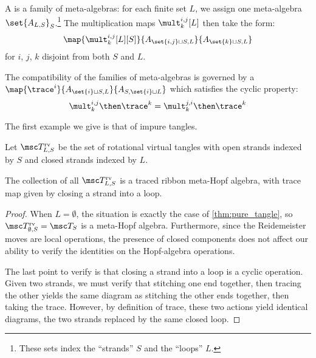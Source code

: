 \documentclass{article}
\begin{document}
\begin{definition}
        A  is a family of meta-algebras: for each
        finite set $L$, we assign one meta-algebra $\set{A_{L,
        S}}_S$.\footnote{These sets index the \enquote{strands} $S$ and the
        \enquote{loops} $L$.} The multiplication maps $\mult^{i,j}_k[L]$ then
        take the form:
        \begin{equation}
                \map {\mult^{i,j}_k[L][S]}
                        {A_{\set{i,j}\sqcup S, L}}
                        {A_{\set{k}\sqcup S, L}} 
        \end{equation}
        for $i$, $j$, $k$ disjoint from both $S$ and $L$.

        The compatibility of the families of meta-algebras is governed by a
        $\map {\trace^i} {A_{\set{i}\sqcup S, L}} {A_{S,\set{i}\sqcup L}}$ which
        satisfies the cyclic property:
        \begin{equation}
                \mult^{i,j}_{k}\then\trace^k
                =
                \mult^{j,i}_{k}\then\trace^k
        \end{equation}
\end{definition}

The first example we give is that of impure tangles.

\begin{definition}
        Let $\RVT_{L, S}$ be the set of rotational virtual tangles with open
        strands indexed by $S$ and closed strands indexed by $L$.
\end{definition}

\begin{lemma}
        The collection of all $\RVT_{L, S}$ is a traced ribbon meta-Hopf
        algebra, with trace map given by closing a strand into a loop.
\end{lemma}
\begin{proof}
        When $L = \emptyset$, the situation is exactly the case of
        \cref{thm:pure_tangle}, so $\RVT_{\emptyset, S} = \tangle_S$ is a
        meta-Hopf algebra. Furthermore, since the Reidemeister moves are local
        operations, the presence of closed components does not affect our
        ability to verify the identities on the Hopf-algebra operations.

        The last point to verify is that closing a strand into a loop is a
        cyclic operation. Given two strands, we must verify that stitching one
        end together, then tracing the other yields the same diagram as
        stitching the other ends together, then taking the trace. However, by
        definition of trace, these two actions yield identical diagrams, the two
        strands replaced by the same closed loop.
\end{proof}
\end{document}
